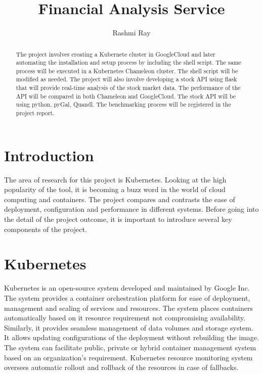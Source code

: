 
\title{Financial Analysis Service}

\author{Rashmi Ray}

\renewcommand{\shortauthors}{Uma Kugan}

\begin{abstract}
The project involves creating a Kubernete cluster in GoogleCloud and later 
automating the installation and setup process by including the shell script.
The same process will be executed in a Kubernetes Chameleon cluster. The shell
script will be modified as needed. The project will also involve developing a 
stock API using flask that will provide real-time analysis of the stock market 
data. The performance of the API will be compared in both Chameleon and 
GoogleCloud. The stock API will be using python, pyGal, Quandl. The 
benchmarking process will be registered in the project report.

\end{abstract}



\maketitle

\section{Introduction}

The area of research for this project is Kubernetes. Looking at the high
 popularity of the tool, it is becoming a buzz word in the world of cloud 
 computing and containers. The project compares and contrasts the ease of
  deployment, configuration and performance in different systems. Before going 
  into the detail of the project outcome, it is important to introduce several
   key components of the project.

\section{Kubernetes}
Kubernetes is an open-source system developed and maintained by Google Inc.
 The system provides a container orchestration platform for ease of deployment, 
 management and scaling of services and resources. The system places containers 
 automatically based on it resource requirement not compromising availability.
  Similarly, it provides seamless management of data volumes and storage system. 
  It allows updating configurations of the deployment without rebuilding the
   image. The system can facilitate public, private or hybrid container 
   management system based on an organization’s requirement.  Kubernetes 
   resource monitoring system oversees automatic rollout and rollback of the 
   resources in case of fallbacks.


